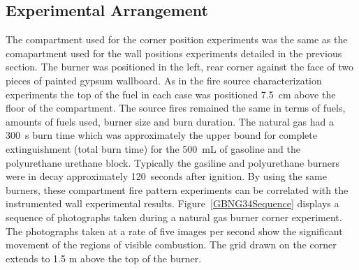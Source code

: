 \documentclass[twoside]{uocthesis}
\begin{document}
{\subsection{Experimental Arrangement}

The compartment used for the corner position experiments was the same as the comapartment used for the wall positions experiments detailed in the previous section.  The burner was positioned in the left, rear corner against the face of two pieces of painted gypsum wallboard. As in the fire source characterization experiments the top of the fuel in each case was positioned 7.5~cm above the floor of the compartment. The source fires remained the same in terms of fuels, amounts of fuels used, burner size and burn duration.  The natural gas had a 300~s burn time which was approximately the upper bound for complete extinguishment (total burn time) for the 500~mL of gasoline and the polyurethane urethane block. Typically the gasiline and polyurethane burners were in decay approximately 120~seconds after ignition. By using the same burners, these compartment fire pattern experiments can be correlated with the instrumented wall experimental results.  Figure~\ref{GBNG34Sequence} displays a sequence of photographs taken during a natural gas burner corner experiment.  The photographs taken at a rate of five images per second show the significant movement of the regions of visible combustion.  The grid drawn on the corner extends to 1.5 m above the top of the burner. 

}
\end{document}
